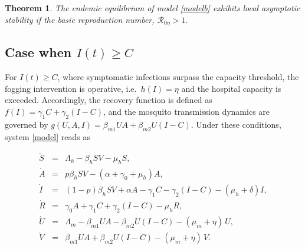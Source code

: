 \documentclass[preprint]{elsarticle}
\newtheorem{theorem}{Theorem}
\begin{document}
\begin{theorem}
    The endemic equilibrium of model \eqref{modelb} exhibits local asymptotic stability if the basic reproduction number, $\mathcal{R}_{0\eta}>1$.
\end{theorem}

\subsection{Case when $I(t)\geq C$}
For $I(t) \geq C$, where symptomatic infections surpass the capacity threshold, the fogging intervention is operative, i.e.~$h(I) = \eta$ and the hospital capacity is exceeded. Accordingly, the recovery function is defined as $f(I) = \gamma_1 C + \gamma_2 (I - C)$, and the mosquito transmission dynamics are governed by $g(U, A, I) = \beta_{m1} UA + \beta_{m2} U(I - C)$. Under these conditions, system \eqref{model} reads as

\begin{eqnarray}
\dot{S} &=& \Lambda_h - \beta_h S V - \mu_h S, \nonumber\\
\dot{A} &=& p \beta_h S V - \left(\alpha + \gamma_0 + \mu_h\right)A, \nonumber\\
\dot{I} &=& (1-p)\beta_h S V + \alpha A - \gamma_1 C-\gamma_2(I-C) - (\mu_h + \delta)I, \label{modelc} \\
\dot{R} &=& \gamma_0 A + \gamma_1 C+\gamma_2(I-C) - \mu_h R, \nonumber \\
\dot{U} &=& \Lambda_m - \beta_{m1}UA-\beta_{m2}U(I-C) - (\mu_m+\eta)\,U, \nonumber\\
\dot{V} &=& \beta_{m1}UA+\beta_{m2}U(I-C) - (\mu_m+\eta)\,V. \nonumber
\end{eqnarray}
\end{document}

